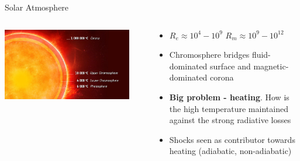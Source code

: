 \documentclass[10pt,aspectratio=169,usenames,dvipsnames]{beamer}
\begin{document}

\begin{frame}{Solar Atmosphere}
\begin{columns}
\begin{column}{0.55\textwidth}
\includegraphics[width=0.9\textwidth]{2023StAndrewsAstro/Figures/sun2.jpg}
\end{column}
\begin{column}{0.45\textwidth}
\begin{itemize}
    \item $R_e \approx 10^4-10^9$ $R_m \approx 10^9-10^{12}$
    \item Chromosphere bridges fluid-dominated surface and magnetic-dominated corona
    \item \textbf{Big problem - heating}. How is the high temperature maintained against the strong radiative losses
    \item Shocks seen as contributor towards heating (adiabatic, non-adiabatic)
\end{itemize}
\end{column}
\end{columns}
\end{frame}
\end{document}
